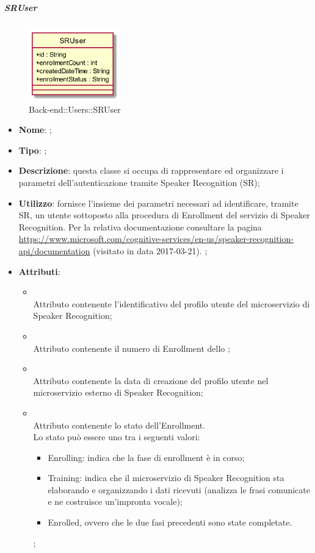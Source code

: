 \hypertarget{SRUser_label}{\subparagraph{SRUser}}
\begin{figure}[h]
	\centering
	\includegraphics[width=0.35\textwidth,height=\textheight,keepaspectratio]{images/ClassSRUser.png}
	\caption{Back-end::Users::SRUser}
\end{figure}
\begin{itemize}
	\item \textbf{Nome}: ;
	\item \textbf{Tipo}: ;
	\item \textbf{Descrizione}: questa classe si occupa di rappresentare ed organizzare i parametri dell'autenticazione tramite Speaker Recognition (SR);
	\item \textbf{Utilizzo}: fornisce l'insieme dei parametri necessari ad identificare, tramite SR, un utente sottoposto alla procedura di Enrollment del servizio di Speaker Recognition.
Per la relativa documentazione consultare la pagina \url{https://www.microsoft.com/cognitive-services/en-us/speaker-recognition-api/documentation}  (visitato in data 2017-03-21).
;
	\item \textbf{Attributi}:
	\begin{itemize}
		\item[]  \\
		Attributo contenente l'identificativo del profilo utente del microservizio di Speaker Recognition;
		\item[]  \\
		Attributo contenente il numero di Enrollment dello ;
		\item[]  \\
		Attributo contenente la data di creazione del profilo utente nel microservizio esterno di Speaker Recognition;
		\item[]  \\
		Attributo contenente lo stato dell'Enrollment.\\
Lo stato può essere uno tra i seguenti valori:
\begin{itemize} \item Enrolling: indica che la fase di enrollment è in corso; \item Training: indica che il microservizio di Speaker Recognition sta elaborando e organizzando i dati ricevuti (analizza le frasi comunicate e ne costruisce un'impronta vocale); \item Enrolled, ovvero che le due fasi precedenti sono state completate. \end{itemize};

\end{itemize}
\end{itemize}
